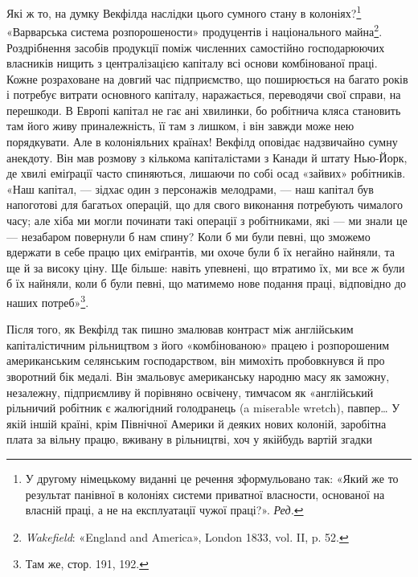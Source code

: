 Які ж то, на думку Векфілда наслідки цього сумного стану в колоніях?\footnote*{
У другому німецькому виданні це речення зформульовано так: «Який же то результат панівної в
колоніях системи приватної власности, основаної на власній праці, а не на експлуатації чужої
праці?». \emph{Ред.}
} «Варварська система
розпорошености» продуцентів і національного майна\footnote{
\emph{Wakefield}: «England and America», London 1833, vol. II, p. 52.
}. Роздрібнення засобів
продукції поміж численних самостійно господарюючих власників нищить з централізацією капіталу всі
основи комбінованої праці. Кожне розраховане на довгий час підприємство, що поширюється на багато
років і потребує витрати основного капіталу, наражається, переводячи свої справи, на перешкоди. В
Европі капітал не гає ані хвилинки, бо робітнича кляса становить там його живу приналежність, її там
з лишком, і він завжди може нею порядкувати. Але в колоніяльних країнах! Векфілд
оповідає надзвичайно сумну анекдоту. Він мав розмову з кількома капіталістами з Канади й штату
Нью-Йорк, де хвилі еміґрації часто спиняються, лишаючи по собі осад «зайвих» робітників. «Наш
капітал, — зідхає один з персонажів мелодрами, — наш капітал був напоготові для багатьох операцій,
що для свого виконання потребують чималого часу; але хіба ми могли починати такі операції з
робітниками, які — ми знали це — незабаром повернули б нам спину? Коли б ми були певні, що зможемо
вдержати в себе працю цих еміґрантів, ми охоче були б їх негайно найняли, та ще й за високу ціну. Ще
більше: навіть упевнені, що втратимо їх, ми все ж були б їх найняли, коли б були певні, що матимемо
нове подання праці, відповідно до наших потреб»\footnote{Там же, стор. 191, 192.}.

Після того, як Векфілд так пишно змалював контраст між англійським капіталістичним рільництвом з
його «комбінованою» працею і розпорошеним американським селянським господарством, він мимохіть
пробовкнувся й про зворотний бік
медалі. Він змальовує американську народню масу як заможну, незалежну, підприємливу й порівняно
освічену, тимчасом як «англійський рільничий робітник є жалюгідний голодранець (a miserable wretch),
павпер\dots{} У якій іншій країні, крім Північної Америки й деяких нових колоній, заробітна плата за
вільну працю, вживану в рільництві, хоч у якійбудь вартій згадки
\parbreak{}  %
